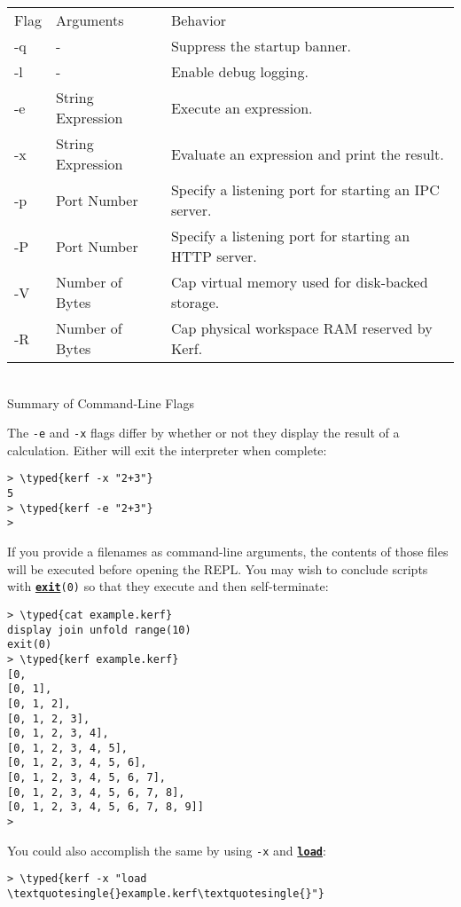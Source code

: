 \documentclass{article}
\newcommand{\typed}[1]{\textcolor{TealBlue}{#1}}
\newcommand{\primu}[2]{\hyperref[prim:#2]{\textbf{\texttt{#1}}}}
\newcommand{\prim}[1]{\primu{#1}{#1}}
\begin{document}
\begin{table}[h]
	\centering
	\begin{tabular}{| l | l | l |}
		\hline
		\cellcolor{tableHeaderColor} Flag &
		\cellcolor{tableHeaderColor} Arguments &
		\cellcolor{tableHeaderColor} Behavior \\
		-q & -                 & Suppress the startup banner. \\
		-l & -                 & Enable debug logging. \\
		-e & String Expression & Execute an expression. \\
		-x & String Expression & Evaluate an expression and print the result. \\
		-p & Port Number       & Specify a listening port for starting an IPC server. \\
		-P & Port Number       & Specify a listening port for starting an HTTP server. \\
		-V & Number of Bytes   & Cap virtual memory used for disk-backed storage. \\
		-R & Number of Bytes   & Cap physical workspace RAM reserved by Kerf. \\
		\hline
	\end{tabular}
	\\ \bigskip Summary of Command-Line Flags
\end{table}

The \texttt{-e} and \texttt{-x} flags differ by whether or not they display the result of a calculation. Either will exit the interpreter when complete:

\begin{Verbatim}
> \typed{kerf -x "2+3"}
5
> \typed{kerf -e "2+3"}
>
\end{Verbatim}

If you provide a filenames as command-line arguments, the contents of those files will be executed before opening the REPL. You may wish to conclude scripts with \prim{exit}\texttt{(0)} so that they execute and then self-terminate:

\begin{Verbatim}
> \typed{cat example.kerf}
display join unfold range(10)
exit(0)
> \typed{kerf example.kerf}
[0, 
[0, 1], 
[0, 1, 2], 
[0, 1, 2, 3], 
[0, 1, 2, 3, 4], 
[0, 1, 2, 3, 4, 5], 
[0, 1, 2, 3, 4, 5, 6], 
[0, 1, 2, 3, 4, 5, 6, 7], 
[0, 1, 2, 3, 4, 5, 6, 7, 8], 
[0, 1, 2, 3, 4, 5, 6, 7, 8, 9]]
>
\end{Verbatim}

\pagebreak
You could also accomplish the same by using \texttt{-x} and \prim{load}:
\begin{Verbatim}
> \typed{kerf -x "load \textquotesingle{}example.kerf\textquotesingle{}"}
\end{Verbatim}
\end{document}
